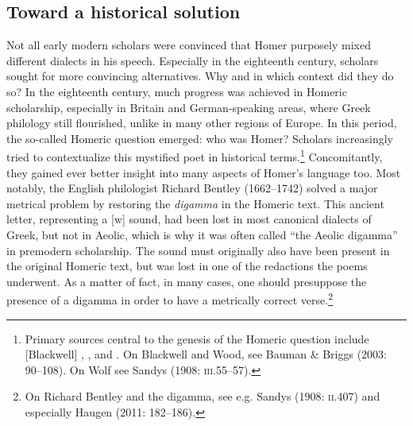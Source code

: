 \documentclass[output=paper]{langsci/langscibook}
\begin{document}
\subsection{Toward a historical solution}
\hypertarget{Toc19704829}{}
Not all early modern scholars were convinced that Homer purposely mixed different dialects in his speech. Especially in the eighteenth century, scholars sought for more convincing alternatives. Why and in which context did they do so? In the eighteenth century, much progress was achieved in Homeric scholarship, especially in Britain and German-speaking areas, where Greek philology still flourished, unlike in many other regions of Europe. In this period, the so-called Homeric question emerged: who was Homer? Scholars increasingly tried to contextualize this mystified poet in historical terms.\footnote{Primary sources central to the genesis of the Homeric question include [Blackwell] , \citet{Wood1775}, and \citet{Wolf1795}. On Blackwell and Wood, see Bauman \& Briggs (2003: 90–108). On Wolf see Sandys (1908: \textsc{iii.}55–57).} Concomitantly, they gained ever better insight into many aspects of Homer’s language too. Most notably, the English philologist Richard Bentley (1662–1742) solved a major metrical problem by restoring the \textit{digamma} in the Homeric text. This ancient letter, representing a [w] sound, had been lost in most canonical dialects of Greek, but not in Aeolic, which is why it was often called “the Aeolic digamma” in premodern scholarship. The sound must originally also have been present in the original Homeric text, but was lost in one of the redactions the poems underwent. As a matter of fact, in many cases, one should presuppose the presence of a digamma in order to have a metrically correct verse.\footnote{On Richard Bentley and the digamma, see e.g. Sandys (1908: \textsc{ii.}407) and especially Haugen (2011: 182–186).}
\end{document}
